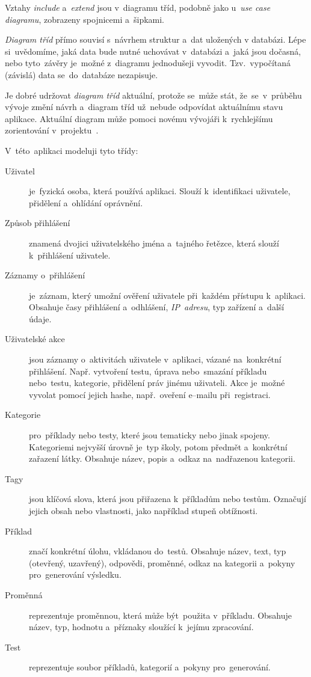 \documentclass[11pt,a4paper]{report}
\begin{document}
                Vztahy \emph{include} a~\emph{extend} jsou v~diagramu tříd, podobně jako u~\emph{use case diagramu}, zobrazeny spojnicemi a~šipkami.

                \emph{Diagram tříd} přímo souvisí s~návrhem struktur a~dat uložených v databázi. Lépe si~uvědomíme, jaká data bude nutné uchovávat v~databázi a~jaká jsou dočasná, nebo tyto~závěry je~možné z~diagramu jednodušeji vyvodit. Tzv.~vypočítaná (závislá) data se~do~databáze nezapisuje.

                Je dobré udržovat \emph{diagram tříd} aktuální, protože se~může stát, že~se~v~průběhu vývoje změní návrh a~diagram tříd už~nebude odpovídat aktuálnímu stavu aplikace. Aktuální diagram může pomoci novému vývojáři k~rychlejšímu zorientování v~projektu~\cite{visualparadigmClassDiagram}.

                
                V~této~aplikaci modeluji tyto třídy:

                \begin{description}
                    \item[Uživatel] je~fyzická osoba, která používá aplikaci. Slouží k~identifikaci uživatele, přidělení a~ohlídání oprávnění.
                    \item[Způsob přihlášení] znamená dvojici uživatelského jména a~tajného řetězce, která slouží k~přihlášení uživatele.
                    \item[Záznamy o~přihlášení] je~záznam, který umožní ověření uživatele při~každém přístupu k~aplikaci. Obsahuje časy přihlášení a~odhlášení, \emph{IP~adresu}, typ zařízení a~další údaje.
                    \item[Uživatelské akce] jsou záznamy o~aktivitách uživatele v~aplikaci, vázané na~konkrétní přihlášení. Např. vytvoření testu, úprava nebo~smazání příkladu nebo~testu, kategorie, přidělení práv jinému uživateli. Akce je~možné vyvolat pomocí jejich hashe, např.~oveření e--mailu při~registraci.
                    \item[Kategorie] pro~příklady nebo testy, které jsou tematicky nebo jinak spojeny. Kategoriemi nejvyšší úrovně je~typ školy, potom předmět a~konkrétní zařazení látky. Obsahuje název, popis a~odkaz na~nadřazenou kategorii.
                    \item[Tagy] jsou klíčová slova, která jsou přiřazena k~příkladům nebo testům. Označují jejich obsah nebo vlastnosti, jako například stupeň obtížnosti.
                    \item[Příklad] značí konkrétní úlohu, vkládanou do~testů. Obsahuje název, text, typ (otevřený, uzavřený), odpovědi, proměnné, odkaz na kategorii a~pokyny pro~generování výsledku.
                    \item[Proměnná] reprezentuje proměnnou, která může být~použita v~příkladu. Obsahuje název, typ, hodnotu a~příznaky sloužící k~jejímu zpracování.
                    \item[Test] reprezentuje soubor příkladů, kategorií a~pokyny pro~generování.
                \end{description}
\end{document}

